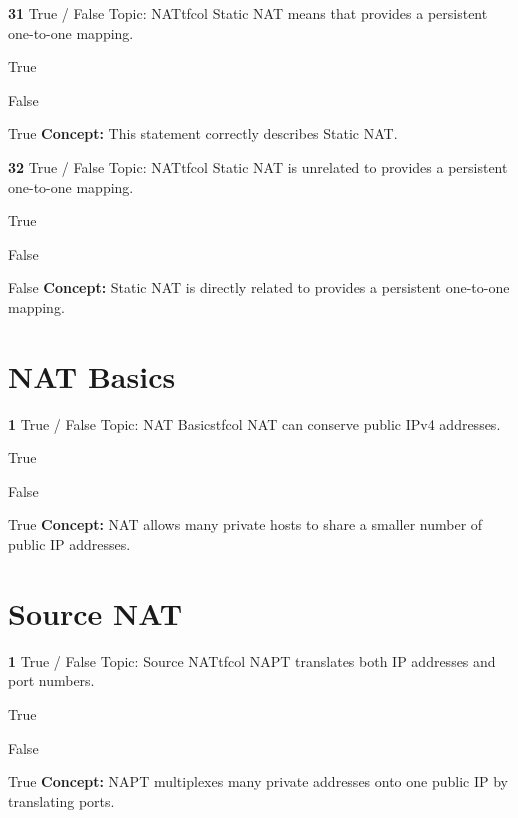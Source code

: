 \documentclass[10pt,a4paper]{article}
\begin{document}
\begin{qcard}{\color{white}\textbf{31} \hfill \small True / False \textbar{} Topic: NAT}{tfcol}
Static NAT means that provides a persistent one-to-one mapping.

\begin{qoptions}
\item True
\item False
\end{qoptions}
\begin{explainbox}{True}
\textbf{Concept:} This statement correctly describes Static NAT.
\end{explainbox}
\end{qcard}

\begin{qcard}{\color{white}\textbf{32} \hfill \small True / False \textbar{} Topic: NAT}{tfcol}
Static NAT is unrelated to provides a persistent one-to-one mapping.

\begin{qoptions}
\item True
\item False
\end{qoptions}
\begin{explainbox}{False}
\textbf{Concept:} Static NAT is directly related to provides a persistent one-to-one mapping.
\end{explainbox}
\end{qcard}

\section{NAT Basics}
\begin{qcard}{\color{white}\textbf{1} \hfill \small True / False \textbar{} Topic: NAT Basics}{tfcol}
NAT can conserve public IPv4 addresses.

\begin{qoptions}
\item True
\item False
\end{qoptions}
\begin{explainbox}{True}
\textbf{Concept:} NAT allows many private hosts to share a smaller number of public IP addresses.
\end{explainbox}
\end{qcard}

\section{Source NAT}
\begin{qcard}{\color{white}\textbf{1} \hfill \small True / False \textbar{} Topic: Source NAT}{tfcol}
NAPT translates both IP addresses and port numbers.

\begin{qoptions}
\item True
\item False
\end{qoptions}
\begin{explainbox}{True}
\textbf{Concept:} NAPT multiplexes many private addresses onto one public IP by translating ports.
\end{explainbox}
\end{qcard}
\end{document}
